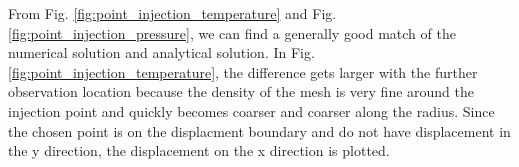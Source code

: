 \documentclass[a4paper,10pt]{article}
\begin{document}
From Fig. \ref{fig:point_injection_temperature} and Fig. \ref{fig:point_injection_pressure}, we can find a generally good match of the numerical solution and analytical solution. In Fig. \ref{fig:point_injection_temperature}, the difference gets larger with the further observation location because the density of the mesh is very fine around the injection point and quickly becomes coarser and coarser along the radius. Since the chosen point is on the displacment boundary and do not have displacement in the y direction, the displacement on the x direction is plotted.  



\end{document}

